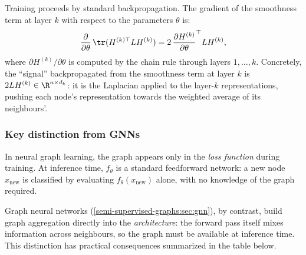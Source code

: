 \begin{notechapter}
Training proceeds by standard backpropagation. The gradient of the smoothness
term at layer $k$ with respect to the parameters $\theta$ is:
\[
\frac{\partial}{\partial \theta}\,\tr(H^{(k)\top} L H^{(k)})
= 2\,\frac{\partial H^{(k)}}{\partial \theta}^\top L H^{(k)},
\]
where $\partial H^{(k)}/\partial \theta$ is computed by the chain rule through
layers $1, \ldots, k$. Concretely, the ``signal'' backpropagated from the
smoothness term at layer $k$ is $2L H^{(k)} \in \R^{n \times d_k}$: it is the
Laplacian applied to the layer-$k$ representations, pushing each node's
representation towards the weighted average of its neighbours'.

\subsubsection*{Key distinction from GNNs}

\begin{pitfall}
In neural graph learning, the graph appears only in the \emph{loss function}
during training. At inference time, $f_\theta$ is a standard feedforward
network: a new node $x_{\text{new}}$ is classified by evaluating
$f_\theta(x_{\text{new}})$ alone, with no knowledge of the graph required.

Graph neural networks (\cref{semi-supervised-graphs:sec:gnn}), by contrast, build graph
aggregation directly into the \emph{architecture}: the forward pass itself
mixes information across neighbours, so the graph must be available at inference
time. This distinction has practical consequences summarized in the table below.
\end{pitfall}

\begin{center}
\small
{}
\end{center}


\end{notechapter}
